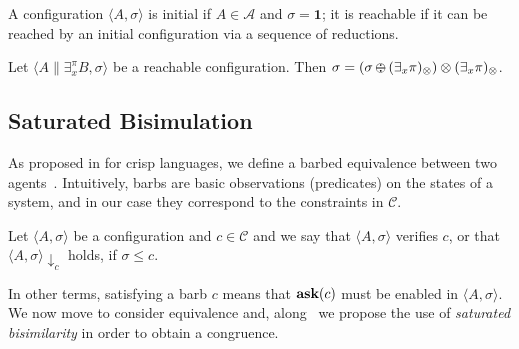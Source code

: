 \documentclass{llncs}
\def\1{{\mathbf 1}}
\newcommand{\ask}{{\bf ask}}
\def\1{{\mathbf 1}}
\def\odiv{\, {\ominus\hspace{-7.7pt} \div} \,}
\begin{document}
\begin{definition}
A configuration $\langle A, \sigma \rangle$ is initial if $A\in \mathcal{A}$
and $\sigma = \1$; it is reachable if it can be reached by an initial configuration 
via a sequence of reductions.
\end{definition}

\begin{lemma}[On monotonicity, II]
\label{mono2}
Let $\langle A \parallel \exists_x^\pi B, \sigma \rangle$ 
be a reachable configuration.
Then $\sigma = (\sigma \odiv (\exists_x \pi)_\otimes) \otimes (\exists_x \pi)_\otimes$.
\end{lemma}




\subsection{Saturated Bisimulation}\label{sec:saturated}
As proposed in \cite{pippo} for crisp languages, we define a barbed equivalence between two agents~\cite{barbed}.  
%
Intuitively, barbs are basic observations (predicates) on the states of a system, and in our case they correspond 
to the constraints in $\mathcal{C}$.

\begin{definition} [Barbs]
Let $\langle A, \sigma \rangle$ be a configuration and $c \in \mathcal{C}$
and we say that $\langle A, \sigma \rangle$ verifies $c$, or that $\langle A, \sigma \rangle \downarrow_c$ holds, if  $\sigma \leq c$.
\end{definition}

In other terms, satisfying a barb $c$ means that $\hbox{\ask}(c)$ must be enabled in $\langle A, \sigma \rangle$.
%
We now move to consider equivalence and, %
along~\cite{pippo}
we propose the use of \emph{saturated bisimilarity}
in order to obtain a congruence.
%
\end{document}
